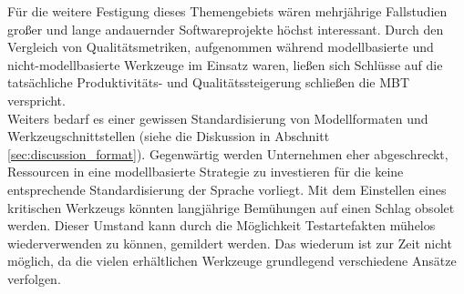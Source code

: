 Für die weitere Festigung dieses Themengebiets wären mehrjährige Fallstudien großer und lange andauernder Softwareprojekte höchst interessant. Durch den Vergleich von Qualitätsmetriken, aufgenommen während modellbasierte und nicht-modellbasierte Werkzeuge im Einsatz waren, ließen sich Schlüsse auf die tatsächliche Produktivitäts- und Qualitätssteigerung schließen die \Gls{MBT} verspricht.\\
Weiters bedarf es einer gewissen Standardisierung von Modellformaten und Werkzeugschnittstellen (siehe die Diskussion in Abschnitt \ref{sec:discussion_format}). Gegenwärtig werden Unternehmen eher abgeschreckt, Ressourcen in eine modellbasierte Strategie zu investieren für die keine entsprechende Standardisierung der Sprache vorliegt. Mit dem Einstellen eines kritischen Werkzeugs könnten langjährige Bemühungen auf einen Schlag obsolet werden. Dieser Umstand kann durch die Möglichkeit Testartefakten mühelos wiederverwenden zu können, gemildert werden. Das wiederum ist zur Zeit nicht möglich, da die vielen erhältlichen Werkzeuge grundlegend verschiedene Ansätze verfolgen.



























